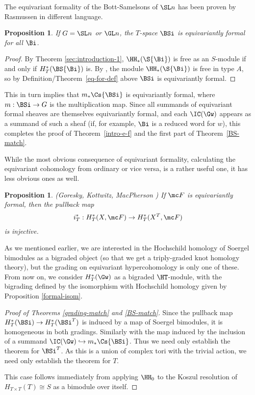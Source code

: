 \documentclass[12pt]{wart}
\newtheorem{prop}[thm]{Proposition}
\theoremstyle{remark}
\begin{document}
The equivariant formality of the Bott-Samelsons of $\SL n$ has been
proven by Rasmussen in different language.  

\begin{prop}
  If $G=\SL n$ or $\GL n$, the $T$-space $\BSi$ is equivariantly formal for all $\Bi$.
\end{prop}
\begin{proof}
  By Theorem \ref{sec:introduction-1}, $\HH_*(\S{\Bi})$ is free as an
  $S$-module if and only if $H^*_T(\BS{\Bi})$ is.  By \cite[Propositon
  4.6]{Ras06}, the module $\HH_*(\S{\Bi})$ is free in type $A$, so by
  Definition/Theorem~\ref{eq-for-def} above $\BSi$ is equivariantly formal.
\end{proof}
This in turn implies that $m_*\Cs{\BSi}$ is equivariantly formal,
where $m:\BSi\to G$ is the multiplication map.  Since all summands of
equivariant formal sheaves are themselves equivariantly formal, and
each $\IC(\Gw)$ appears as a summand of such a sheaf (if, for example,
$\Bi$ is a reduced word for $w$), this completes the proof of
Theorem~\ref{intro-e-f} and the first part of Theorem~\ref{BS-match}.

While the most obvious consequence of equivariant formality,
calculating the equivariant cohomology from ordinary or vice versa, is
a rather useful one, it has less obvious ones as well.

\begin{prop}{\em (Goresky, Kottwitz, MacPherson \cite[Theorem 6.3]{GKM})}
  If $\mc F$ is equivariantly formal, then the pullback map
  \begin{equation*}
    i^*_T:H_T^*(X,\mc F)\to H_T^*(X^T,\mc F)%
  \end{equation*}
  is injective.
\end{prop}

As we mentioned earlier, we are interested in the Hochschild homology
of Soergel bimodules as a bigraded object (so that we get a
triply-graded knot homology theory), but the grading on equivariant
hypercohomology is only one of these.  From now on, we consider
$H^*_T(\Gw)$ as a bigraded $\HT$-module, with the bigrading defined by
the isomorphism with Hochschild homology given by Proposition
\ref{formal-isom}.

\begin{proof}[Proof of Theorems \ref{grading-match} and \ref{BS-match}]
  Since the pullback map $H_T^*(\BSi)\to H_T^*(\BSi^T)$ is induced by
  a map of Soergel bimodules, it is homogeneous in both gradings.
  Similarly with the map induced by the inclusion of a summand
  $\IC(\Gw)\hookrightarrow m_*\Cs{\BSi}$.  Thus we need only establish
  the theorem for $\BSi^T$.  As this is a union of complex tori with
  the trivial action, we need
  only establish the theorem for $T$.

  This case follows immediately from applying $\HH_0$ to the Koszul
  resolution of $H_{T\times T}(T)\cong S$ as a bimodule over itself.
\end{proof}
\end{document}
